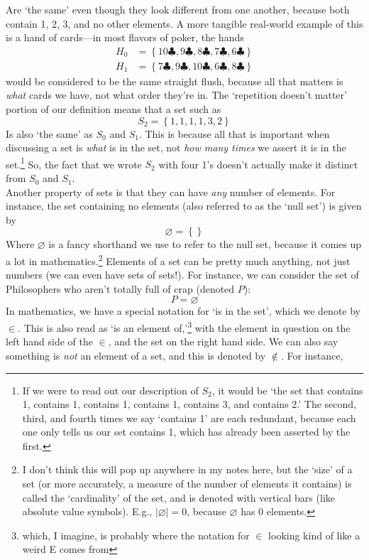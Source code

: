 \documentclass[10pt]{article}
\theoremstyle{definition}
\newcommand{\set}[1]{\left\{ #1 \right\}}
\begin{document}
Are `the same' even though they look different from one another, because both contain 1, 2, 3, and no other elements.  A more tangible real-world example of this is a hand of cards---in most flavors of poker, the hands
\begin{align*}
H_0 &= \set{10\clubsuit,9\clubsuit, 8\clubsuit, 7\clubsuit, 6\clubsuit}\\
H_1 &= \set{7\clubsuit,9\clubsuit, 10\clubsuit, 6\clubsuit, 8\clubsuit}
\end{align*}
would be considered to be the same straight flush, because all that matters is \emph{what} cards we have, not what order they're in.  The `repetition doesn't matter' portion of our definition means that a set such as
\[S_2 = \set{1,1,1,1,3,2}\] 
Is also `the same' as $S_0$ and $S_1$.  This is because all that is important when discussing a set is \emph{what} is in the set, not \emph{how many times} we assert it is in the set.\footnote{If we were to read out our description of $S_2$, it would be `the set that contains 1, contains 1, contains 1, contains 1, contains 3, and contains 2.'  The second, third, and fourth times we say `contains 1' are each redundant, because each one only tells us our set contains 1, which has already been asserted by the first.}  So, the fact that we wrote $S_2$ with four 1's doesn't actually make it distinct from $S_0$ and $S_1$.  
\\
Another property of sets is that they can have \emph{any} number of elements.  For instance, the set containing no elements (also referred to as the `null set') is given by 
\[\varnothing = \set{}\]
Where $\varnothing$ is a fancy shorthand we use to refer to the null set, because it comes up a lot in mathematics.\footnote{I don't think this will pop up anywhere in my notes here, but the `size' of a set (or more accurately, a measure of the number of elements it contains) is called the `cardinality' of the set, and is denoted with vertical bars (like absolute value symbols).  E.g., $|\varnothing| = 0$, because $\varnothing$ has 0 elements.}  
Elements of a set can be pretty much anything, not just numbers (we can even have sets of sets!).  For instance, we can consider the set of Philosophers who aren't totally full of crap (denoted $P$): 
\[P = \varnothing\]
In mathematics, we have a special notation for `is in the set', which we denote by $\in$.  This is also read as `is an element of,'\footnote{which, I imagine, is probably where the notation for $\in$ looking kind of like a weird E comes from} with the element in question on the left hand side of the $\in$, and the set on the right hand side.  We can also say something is \emph{not} an element of a set, and this is denoted by $\notin$.  For instance, 
\end{document}
